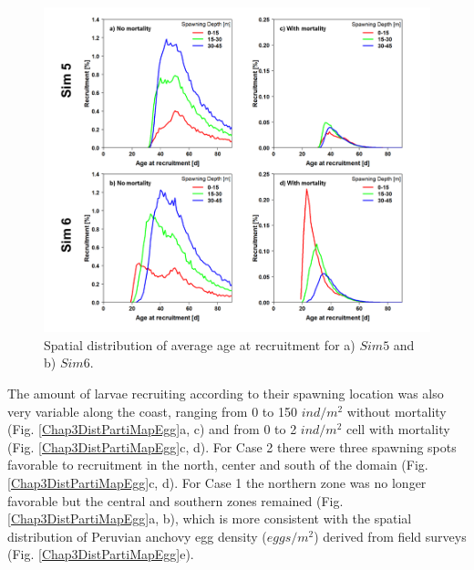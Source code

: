 \begin{figure}[H]
	\includegraphics[width=1.0\textwidth]{figures/Chap3LinesAgeRecruSim5Sim6.png}
	\centering
	\caption{Spatial distribution of average age at recruitment for a) $Sim5$ and b) $Sim6$.}
	\label{Chap3LinesAgeRecruSim5Sim6}
\end{figure}

The amount of larvae recruiting according to their spawning location was also very variable along the coast, ranging from 0 to 150 $ind/m^2$ without mortality (Fig. \ref{Chap3DistPartiMapEgg}a, c) and from 0 to 2 $ind/m^2$ cell with mortality (Fig. \ref{Chap3DistPartiMapEgg}c, d). For Case 2 there were three spawning spots favorable to recruitment in the north, center and south of the domain (Fig. \ref{Chap3DistPartiMapEgg}c, d). For Case 1 the northern zone was no longer favorable but the central and southern zones remained (Fig. \ref{Chap3DistPartiMapEgg}a, b), which is more consistent with the spatial distribution of Peruvian anchovy egg density ($eggs/m^2$) derived from field surveys (Fig. \ref{Chap3DistPartiMapEgg}e).\\

